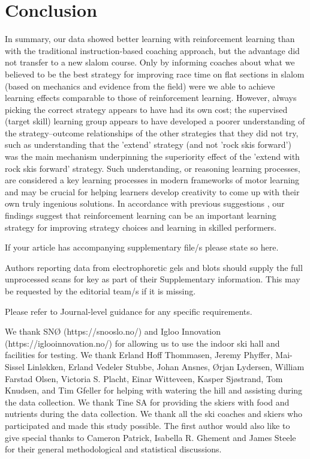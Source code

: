 \documentclass[pdflatex,sn-nature]{sn-jnl}%
\theoremstyle{thmstyleone}%
\theoremstyle{thmstyletwo}%
\theoremstyle{thmstylethree}%
\begin{document}
\section{Conclusion}
In summary, our data showed better learning with reinforcement learning than with the traditional instruction-based coaching approach, but the advantage did not transfer to a new slalom course. Only by informing coaches about what we believed to be the best strategy for improving race time on flat sections in slalom (based on mechanics and evidence from the field) were we able to achieve learning effects comparable to those of reinforcement learning. However, always picking the correct strategy appears to have had its own cost; the supervised (target skill) learning group appears to have developed a poorer understanding of the strategy–outcome relationships of the other strategies that they did not try, such as understanding that the 'extend' strategy (and not 'rock skis forward') was the main mechanism underpinning the superiority effect of the 'extend with rock skis forward' strategy. Such understanding, or reasoning learning processes, are considered a key learning processes in modern frameworks of motor learning \cite{tsay_strategy_2023} and may be crucial for helping learners develop creativity to come up with their own truly ingenious solutions\cite{ericsson_scientific_1998}. In accordance with previous suggestions \cite{lohse_errors_2019, yarrow_inside_2009}, our findings suggest that reinforcement learning can be an important learning strategy for improving strategy choices and learning in skilled performers. 



\backmatter


If your article has accompanying supplementary file/s please state so here. 

Authors reporting data from electrophoretic gels and blots should supply the full unprocessed scans for key as part of their Supplementary information. This may be requested by the editorial team/s if it is missing.

Please refer to Journal-level guidance for any specific requirements.

We thank SNØ (https://snooslo.no/) and Igloo Innovation (https://iglooinnovation.no/) for allowing us to use the indoor ski hall and facilities for testing. We thank Erland Hoff Thommasen, Jeremy Phyffer, Mai-Sissel Linløkken, Erland Vedeler Stubbe, Johan Ansnes, Ørjan Lydersen, William Farstad Olsen, Victoria S. Placht, Einar Witteveen, Kasper Sjøstrand, Tom Knudsen, and Tim Gfeller for helping with watering the hill and assisting during the data collection. We thank Tine SA for providing the skiers with food and nutrients during the data collection. We thank all the ski coaches and skiers who participated and made this study possible. The first author would also like to give special thanks to Cameron Patrick, Isabella R. Ghement and James Steele for their general methodological and statistical discussions.
\end{document}
